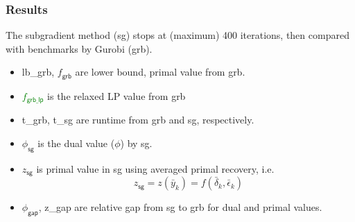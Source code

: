 \begin{frame}
  \frametitle{Results}

  The subgradient method (sg) stops at (maximum) 400 iterations, then compared with benchmarks by Gurobi (grb).
  \begin{itemize}
    \item lb\_grb, \(f_{\textsf{grb}}\)  are lower bound, primal value from grb.
    \item \textcolor{green}{\(f_{\textsf{grb\_lp}}\)} is the relaxed LP value from grb
    \item t\_grb, t\_sg are runtime from grb and sg, respectively.
    \item \(\phi_{\textsf{sg}}\) is the dual value (\(\phi\)) by sg.
    \item \(z_{\textsf{sg}}\) is primal value in sg using averaged primal recovery, i.e.
          \[z_{\textsf{sg}} = z(\bar y_k) = f(\bar \delta_k, \bar \epsilon_k)\]
    \item \(\phi_{\textsf{gap}}\), z\_gap are relative gap from sg to grb for dual and primal values.
  \end{itemize}
\end{frame}

